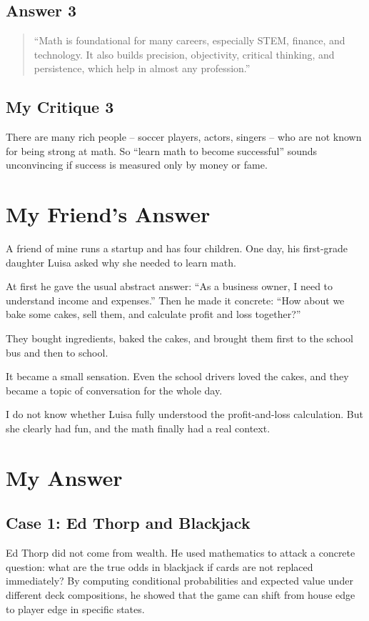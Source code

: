 \subsection*{Answer 3}
\begin{quote}
``Math is foundational for many careers, especially STEM, finance, and
technology.  It also builds precision, objectivity, critical thinking, and
persistence, which help in almost any profession.''
\end{quote}

\subsection*{My Critique 3}
There are many rich people -- soccer players, actors, singers -- who are not
known for being strong at math.  So ``learn math to become successful'' sounds
unconvincing if success is measured only by money or fame.

\section{My Friend's Answer}
A friend of mine runs a startup and has four children.  One day, his
first-grade daughter Luisa asked why she needed to learn math.

At first he gave the usual abstract answer: ``As a business owner, I need to
understand income and expenses.''  Then he made it concrete: ``How about we
bake some cakes, sell them, and calculate profit and loss together?''

They bought ingredients, baked the cakes, and brought them first to the school
bus and then to school.

It became a small sensation.  Even the school drivers loved the cakes, and they
became a topic of conversation for the whole day.

I do not know whether Luisa fully understood the profit-and-loss calculation.
But she clearly had fun, and the math finally had a real context.

\section{My Answer}

\subsection*{Case 1: Ed Thorp and Blackjack}
Ed Thorp did not come from wealth.  He used mathematics to attack a concrete
question: what are the true odds in blackjack if cards are not replaced
immediately?  By computing conditional probabilities and expected value under
different deck compositions, he showed that the game can shift from house edge
to player edge in specific states.

